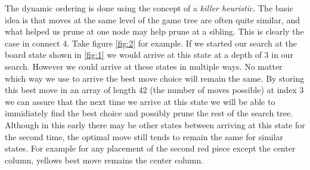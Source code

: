 \documentclass{article}
\begin{document}
		The dynamic ordering is done using the concept of a \emph{killer heuristic}. The basic idea is that moves at the same level of the game tree are often quite similar, and what helped us prune at one node may help prune at a sibling. This is clearly the case in connect 4. Take figure \ref{fig:2} for example. If we started our search at the board state shown in \ref{fig:1} we would arrive at this state at a depth of 3 in our search. However we could arrive at these states in multiple ways. No matter which way we use to arrive the best move choice will remain the same. By storing this best move in an array of length 42 (the number of moves possible) at index 3 we can assure that the next time we arrive at this state we will be able to immidiately find the best choice and possibly prune the rest of the search tree. Although in this early there may be other states between arriving at this state for the second time, the optimal move still tends to remain the same for similar states. For example for any placement of the second red piece except the center column, yellows best move remains the center column.
\end{document}
